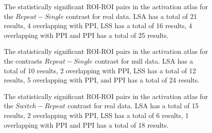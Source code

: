 \documentclass[phd,appendix,figures]{uithesis}
\begin{document}
\begin{figure}[H]
  \ContinuedFloat
  \centering


  \caption[All contrasts for all atlases for all data for LSA/LSS versus PPI continued...]{
      The statistically significant ROI-ROI pairs in the activation atlas
      for the $Repeat - Single$ contrast for real data.
      LSA has a total of 21 results, 4 overlapping with PPI,
      LSS has a total of 16 results, 4 overlapping with PPI and
      PPI has a total of 25 results.
  }
  \label{fig:data-real_type-brain_atlas-activation_contrast-repeatxsingle}
\end{figure}

\begin{figure}[H]
  \ContinuedFloat
  \centering


  \caption[All contrasts for all atlases for all data for LSA/LSS versus PPI continued...]{
      The statistically significant ROI-ROI pairs in the activation atlas
      for the contrasts $Repeat - Single$ contrast for null data.
      LSA has a total of 10 results, 2 overlapping with PPI,
      LSS has a total of 12 results, 5 overlapping with PPI,
      and PPI has a total of 24 results.
  }
  \label{fig:data-null_type-brain_atlas-activation_contrast-repeatxsingle}
\end{figure}

\begin{figure}[H]
  \ContinuedFloat
  \centering


  \caption[All contrasts for all atlases for all data for LSA/LSS versus PPI continued...]{
      The statistically significant ROI-ROI pairs in the activation atlas
      for the $Switch - Repeat$ contrast for real data.
      LSA has a total of 15 results, 2 overlapping with PPI,
      LSS has a total of 6 results, 1 overlapping with PPI and
      PPI has a total of 18 results.
  }
  \label{fig:data-real_type-brain_atlas-activation_contrast-switchxrepeat}
\end{figure}
\end{document}
